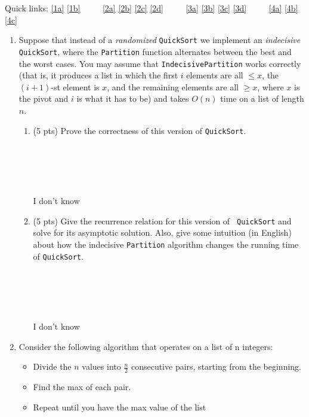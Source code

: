 \documentclass[12pt]{article}
\begin{document}
\renewcommand{\headrulewidth}{0.5pt}
\phantom{Test}

Quick links: \ref{1a} \ref{1b} $\qquad$ \ref{2a} \ref{2b} \ref{2c} \ref{2d} $\qquad$ \ref{3a} \ref{3b} \ref{3c} \ref{3d} $\qquad$ \ref{4a} \ref{4b} \ref{4c}

\vspace{-3mm}

\begin{enumerate}

\item Suppose that instead of a {\sl randomized} {\tt QuickSort} we implement
an {\sl indecisive} {\tt QuickSort}, where the {\tt Partition} function
alternates between the best and the worst cases. You may assume that {\tt IndecisivePartition} works correctly (that is, it produces a list in which the first $i$ elements are all $\leq x$, the $(i+1)$-st element is $x$, and the remaining elements are all $\geq x$, where $x$ is the pivot and $i$ is what it has to be) and takes $O(n)$ time on a list of length $n$.

\begin{enumerate}
    \item \label{1a} (5 pts) Prove the correctness of this version of {\tt QuickSort}.
    \\ \\ \\ \\ \\ \\ I don't know
    \pagebreak	
    \item \label{1b} (5 pts) Give the recurrence relation for this version of {\tt
    QuickSort} and solve for its asymptotic solution. Also, give some intuition
    (in English) about how the indecisive {\tt Partition} algorithm changes the
    running time of {\tt QuickSort}.
    \\ \\ \\ \\ \\ \\ I don't know
    \pagebreak	
\end{enumerate}
	

\item Consider the following algorithm that operates on a list of n integers:
\begin{itemize}
    \item Divide the $n$ values into $\frac{n}{2}$ consecutive pairs, starting from the beginning.
    \item Find the max of each pair.
    \item Repeat until you have the max value of the list
\end{itemize}


\end{enumerate}
\end{document}
